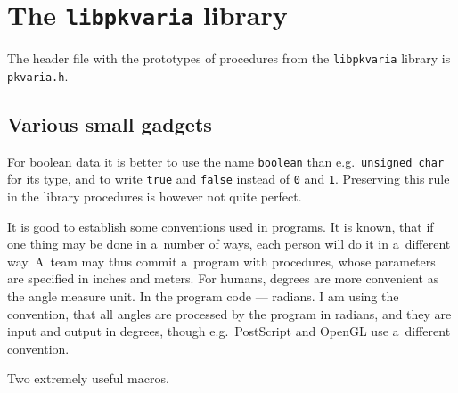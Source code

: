 

\chapter{The \texttt{libpkvaria} library}

The header file with the prototypes of procedures from the \texttt{libpkvaria}
library is \texttt{pkvaria.h}.

\section{Various small gadgets}

\hspace*{\parindent}
For boolean data it is better to use the name \texttt{boolean} than
e.g.\ \texttt{unsigned char} for its type, and to write
\texttt{true} and \texttt{false} instead of \texttt{0} and \texttt{1}.
Preserving this rule in the library procedures is however not quite perfect.

It is good to establish some conventions used in programs. It is known, that
if one thing may be done in a~number of ways, each person will do it
in a~different way. A~team may thus commit a~program with procedures,
whose parameters are specified in inches and meters.
For humans, degrees are more convenient as the angle measure unit.
In the program code --- radians. I am using the convention, that all
angles are processed by the program in radians, and they are input and output
in degrees, though e.g.\ PostScript and OpenGL use a~different convention.

\vspace{\bigskipamount}
Two extremely useful macros.

